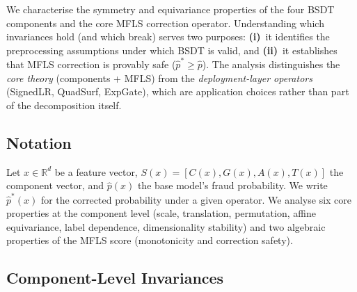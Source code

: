 \documentclass[journal]{IEEEtran}
\begin{document}
We characterise the symmetry and equivariance properties of the four BSDT components and the core MFLS correction operator.  Understanding which invariances hold (and which break) serves two purposes: \textbf{(i)}~it identifies the preprocessing assumptions under which BSDT is valid, and \textbf{(ii)}~it establishes that MFLS correction is provably safe ($\hat{p}^* \geq \hat{p}$).  The analysis distinguishes the \emph{core theory} (components + MFLS) from the \emph{deployment-layer operators} (SignedLR, QuadSurf, ExpGate), which are application choices rather than part of the decomposition itself.

\subsection{Notation}

Let $x \in \mathbb{R}^d$ be a feature vector, $S(x) = [C(x), G(x), A(x), T(x)]$ the component vector, and $\hat{p}(x)$ the base model's fraud probability.  We write $\hat{p}^*(x)$ for the corrected probability under a given operator.  We analyse six core properties at the component level (scale, translation, permutation, affine equivariance, label dependence, dimensionality stability) and two algebraic properties of the MFLS score (monotonicity and correction safety).

\subsection{Component-Level Invariances}
\end{document}

